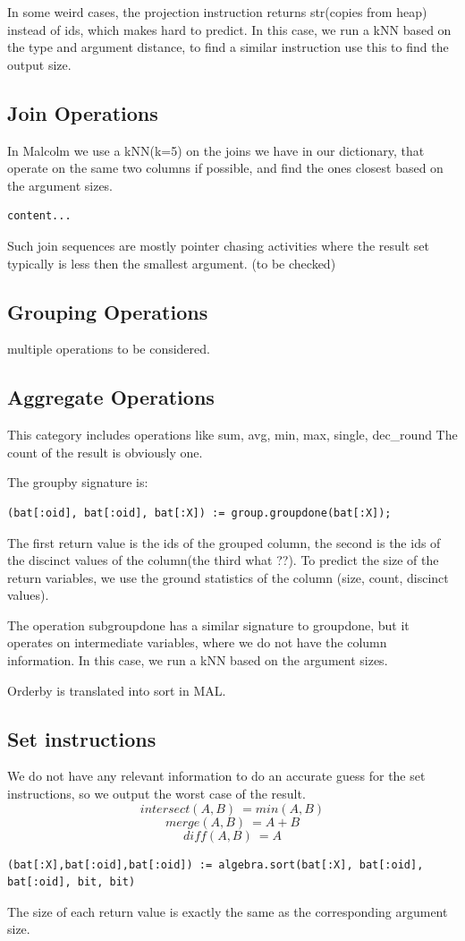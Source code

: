 \documentclass[conference]{IEEEtran}
\begin{document}
In some weird cases, the projection instruction
returns str(copies from heap) instead of ids,
which makes hard to predict. In this case, we run a kNN
based on the type and argument distance, to find a similar
instruction use this to find the output size.

\subsection{Join Operations}
In Malcolm we use a kNN(k=5) on the joins we have in our dictionary,
that operate on the same two columns if possible,
and find the ones closest based on the argument sizes.

\begin{verbatim}
content...
\end{verbatim}
Such join sequences are mostly pointer chasing activities where the result set typically is less then the smallest argument. (to be checked)

\subsection{Grouping Operations}
multiple operations to be considered.

\subsection{Aggregate Operations}
This category includes operations like sum, avg, min, max, single, dec\_round
The count of the result is obviously one.

The groupby signature is:
\begin{verbatim}
(bat[:oid], bat[:oid], bat[:X]) := group.groupdone(bat[:X]);
\end{verbatim}
The first return value is the ids of the grouped column, the second is
the ids of the discinct values of the column(the third what ??). To predict
the size of the return variables, we use the ground statistics of the column
(size, count, discinct values).

The operation subgroupdone has a similar signature to groupdone, but it operates on intermediate
variables, where we do not have the column information. In this case, we run a
kNN based on the argument sizes.

Orderby is translated into sort in MAL.

\subsection{Set instructions}
We do not have any relevant information to do an accurate guess for the
set instructions, so we output the worst case of the result.
$$ intersect(A,B) ~= min(A,B)$$
$$ merge(A,B) ~= A+B $$
$$ diff(A,B) ~= A $$
\begin{verbatim}
(bat[:X],bat[:oid],bat[:oid]) := algebra.sort(bat[:X], bat[:oid], bat[:oid], bit, bit)
\end{verbatim}
The size of each return value is exactly the same as the corresponding argument size.
\end{document}
